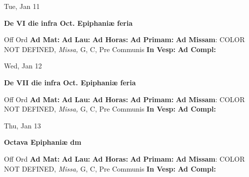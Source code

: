 \documentclass[10pt]{memoir}
\begin{document}
\begin{center}
\begin{minipage}{3.5in}
\vspace{2em}
\begin{center}Tue, Jan 11
\end{center}
\textbf{ \large De VI die infra Oct. Epiphaniæ
\textnormal{\normalsize feria}}

\begin{justify}Off Ord
\textbf{Ad Mat: }
\textbf{Ad Lau: }
\textbf{Ad Horas: }
\textbf{Ad Primam: }\textbf{Ad Missam}: COLOR NOT DEFINED, \textit{Missa,} G, C, Pre Communis
\textbf{In Vesp: }
\textbf{Ad Compl: }
\end{justify}
\end{minipage}
\end{center}

\begin{center}
\begin{minipage}{3.5in}
\vspace{2em}
\begin{center}Wed, Jan 12
\end{center}
\textbf{ \large De VII die infra Oct. Epiphaniæ
\textnormal{\normalsize feria}}

\begin{justify}Off Ord
\textbf{Ad Mat: }
\textbf{Ad Lau: }
\textbf{Ad Horas: }
\textbf{Ad Primam: }\textbf{Ad Missam}: COLOR NOT DEFINED, \textit{Missa,} G, C, Pre Communis
\textbf{In Vesp: }
\textbf{Ad Compl: }
\end{justify}
\end{minipage}
\end{center}

\begin{center}
\begin{minipage}{3.5in}
\vspace{2em}
\begin{center}Thu, Jan 13
\end{center}
\textbf{ \large Octava Epiphaniæ
\textnormal{\normalsize dm}}

\begin{justify}Off Ord
\textbf{Ad Mat: }
\textbf{Ad Lau: }
\textbf{Ad Horas: }
\textbf{Ad Primam: }\textbf{Ad Missam}: COLOR NOT DEFINED, \textit{Missa,} G, C, Pre Communis
\textbf{In Vesp: }
\textbf{Ad Compl: }
\end{justify}
\end{minipage}
\end{center}
\end{document}
